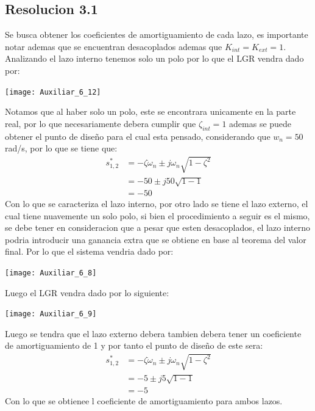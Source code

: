 \documentclass[
  11pt,
  letterpaper,
   addpoints,
   answers
  ]{exam}
\begin{document}
\begin{questions}
\begin{enumerate}
\end{enumerate}
\begin{solution}
\subsection*{Resolucion 3.1}
Se busca obtener los coeficientes de amortiguamiento de cada lazo, es importante notar ademas que se encuentran desacoplados ademas que $K_{int}=K_{ext}=1$. Analizando el lazo interno tenemos solo un polo por lo que el LGR vendra dado por:
\begin{center}
    \texttt{[image: Auxiliar\_6\_12]}
\end{center}
Notamos que al haber solo un polo, este se encontrara unicamente en la parte real, por lo que necesariamente debera cumplir que $\zeta_{int} = 1$ ademas se puede obtener el punto de diseño para el cual esta pensado, considerando que $w_{n}=50$ rad/s, por lo que se tiene que:
\begin{align}
    s_{1,2}^{*} &= -\zeta \omega_{n} \pm j\omega_{n}\sqrt{1-\zeta^{2}}\\
    & = -50 \pm j50\sqrt{1-1}\\
    & = -50
\end{align}
Con lo que se caracteriza el lazo interno, por otro lado se tiene el lazo externo, el cual tiene nuavemente un solo polo, si bien el procedimiento a seguir es el mismo, se debe tener en consideracion que a pesar que esten desacoplados, el lazo interno podria introducir una ganancia extra que se obtiene en base al teorema del valor final. Por lo que el sistema vendria dado por:
\begin{center}
    \texttt{[image: Auxiliar\_6\_8]}
\end{center}
Luego el LGR vendra dado por lo siguiente:
\begin{center}
    \texttt{[image: Auxiliar\_6\_9]}
\end{center}
Luego se tendra que el lazo externo debera tambien debera tener un coeficiente de amortiguamiento de 1 y por tanto el punto de diseño de este sera:
\begin{align}
    s_{1,2}^{*} &= -\zeta \omega_{n} \pm j\omega_{n}\sqrt{1-\zeta^{2}}\\
    & = -5 \pm j5\sqrt{1-1}\\
    & = -5
\end{align}
Con lo que se obtienee l coeficiente de amortiguamiento para ambos lazos.

\end{solution}
\end{questions}
\end{document}
